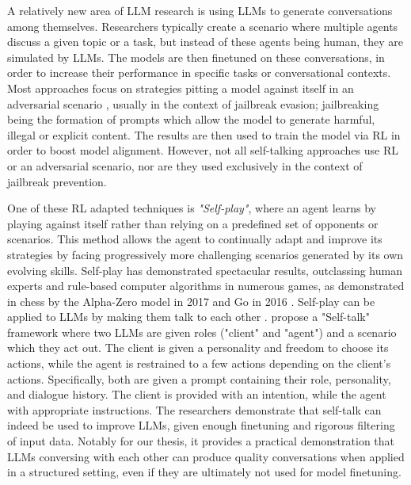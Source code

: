 A relatively new area of LLM research is using LLMs to generate conversations among themselves. Researchers typically create a scenario where multiple agents discuss a given topic or a task, but instead of these agents being human, they are simulated by LLMs. The models are then finetuned on these conversations, in order to increase their performance in specific tasks or conversational contexts. Most approaches focus on strategies pitting a model against itself in an adversarial scenario \cite{liu2024largelanguagemodelsagents, cheng2024selfplayingadversariallanguagegame, zheng2024optimalllmalignmentsusing}, usually in the context of jailbreak evasion; jailbreaking being the formation of prompts which allow the model to generate harmful, illegal or explicit content. The results are then used to train the model via \ac{RL} in order to boost model alignment. However, not all self-talking approaches use \ac{RL} or an adversarial scenario, nor are they used exclusively in the context of jailbreak prevention.

One of these \ac{RL} adapted techniques is \textit{"Self-play"}, where an agent learns by playing against itself rather than relying on a predefined set of opponents or scenarios. This method allows the agent to continually adapt and improve its strategies by facing progressively more challenging scenarios generated by its own evolving skills. Self-play has demonstrated spectacular results, outclassing human experts and rule-based computer algorithms in numerous games, as demonstrated in chess by the Alpha-Zero model in 2017 \cite{silver2017masteringchessshogiselfplay} and Go in 2016 \cite{vincent_2019_ai_go}. Self-play can be applied to LLMs by making them talk to each other \cite{cheng2024selfplayingadversariallanguagegame}.  \citet{ulmer2024bootstrappingllmbasedtaskorienteddialogue} propose a "Self-talk" framework where two LLMs are given roles ("client" and "agent") and a scenario which they act out. The client is given a personality and freedom to choose its actions, while the agent is restrained to a few actions depending on the client's actions. Specifically, both are given a prompt containing their role, personality, and dialogue history. The client is provided with an intention, while the agent with appropriate instructions. The researchers demonstrate that self-talk can indeed be used to improve LLMs, given enough finetuning and rigorous filtering of input data. Notably for our thesis, it provides a practical demonstration that LLMs conversing with each other can produce quality conversations when applied in a structured setting, even if they are ultimately not used for model finetuning.

